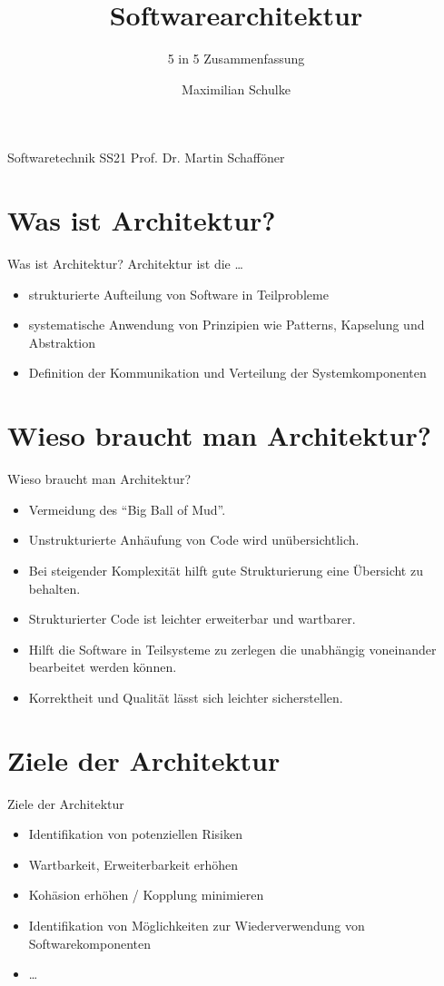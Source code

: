 \documentclass{beamer}
\title{Softwarearchitektur}
\subtitle{5 in 5 Zusammenfassung}
\author{Maximilian Schulke}
\begin{document}
\begin{frame}
	Softwaretechnik \hfill SS21
	\titlepage
	Prof. Dr. Martin Schafföner
\end{frame}

\section{Was ist Architektur?}

\begin{frame}{Was ist Architektur?}
	Architektur ist die \dots
	\begin{itemize}
		\item{strukturierte Aufteilung von Software in Teilprobleme}
		\item{systematische Anwendung von Prinzipien wie Patterns, Kapselung und
			Abstraktion}
		\item{Definition der Kommunikation und Verteilung der
			Systemkomponenten}
	\end{itemize}
\end{frame}

\section{Wieso braucht man Architektur?}

\begin{frame}{Wieso braucht man Architektur?}
	\begin{itemize}
		\item{Vermeidung des ``Big Ball of Mud''.}
		\item{Unstrukturierte Anhäufung von Code wird unübersichtlich.}
		\item{Bei steigender Komplexität hilft gute Strukturierung eine
			Übersicht zu behalten.}
		\item{Strukturierter Code ist leichter erweiterbar und wartbarer.}
		\item{Hilft die Software in Teilsysteme zu zerlegen die unabhängig
			voneinander bearbeitet werden können.}
		\item{Korrektheit und Qualität lässt sich leichter sicherstellen.}
	\end{itemize}
\end{frame}

\section{Ziele der Architektur}

\begin{frame}{Ziele der Architektur}
	\begin{itemize}
		\item{Identifikation von potenziellen Risiken}
		\item{Wartbarkeit, Erweiterbarkeit erhöhen}
		\item{Kohäsion erhöhen / Kopplung minimieren}
		\item{Identifikation von Möglichkeiten zur Wiederverwendung von
			Softwarekomponenten}
		\item{\dots}
	\end{itemize}
\end{frame}
\end{document}
